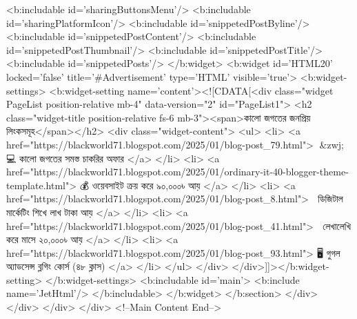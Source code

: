 {{{{    <b:includable id='sharingButtonsMenu'/>
    <b:includable id='sharingPlatformIcon'/>
    <b:includable id='snippetedPostByline'/>
    <b:includable id='snippetedPostContent'/>
    <b:includable id='snippetedPostThumbnail'/>
    <b:includable id='snippetedPostTitle'/>
    <b:includable id='snippetedPosts'/>
  </b:widget>
  <b:widget id='HTML20' locked='false' title='#Advertisement' type='HTML' visible='true'>
    <b:widget-settings>
      <b:widget-setting name='content'><![CDATA[<div class="widget PageList position-relative mb-4" data-version="2" id="PageList1">
<h2 class="widget-title position-relative fs-6 mb-3"><span>কালো জগতের জনপ্রিয় লিংকসমূহ</span></h2>
<div class="widget-content">
<ul>
<li>
<a href="https://blackworld71.blogspot.com/2025/01/blog-post_79.html">
👨&zwj;💻 কালো জগতের  সমস্ত চাকরির অফার
</a>
</li>
<li>
<a href="https://blackworld71.blogspot.com/2025/01/ordinary-it-40-blogger-theme-template.html">
💰 ওয়েবসাইট ক্রয় করে ৯০,০০০৳ আয়
</a>
</li>
<li>
<a href="https://blackworld71.blogspot.com/2025/01/blog-post_8.html">
💸 ডিজিটাল মার্কেটিং শিখে লাখ টাকা আয়
</a>
</li>
<li>
<a href="https://blackworld71.blogspot.com/2025/01/blog-post_41.html">
📝 লেখালেখি করে মাসে ২০,০০০৳ আয়
</a>
</li>
<li>
<a href="https://blackworld71.blogspot.com/2025/01/blog-post_93.html">
🖥️ গুগল অ্যাডসেন্স ব্লগিং কোর্স (৪৮ ক্লাস)
</a>
</li>
</ul>
</div>
</div>]]></b:widget-setting>
    </b:widget-settings>
    <b:includable id='main'>
      <b:include name='JetHtml'/>
    </b:includable>
  </b:widget>
</b:section>
</div>
</div>
</div>
</div>
<!--Main Content End-->


}}}}
